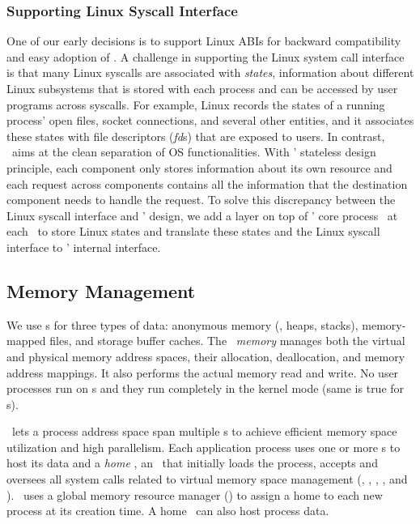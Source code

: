 \subsubsection{Supporting Linux Syscall Interface}
One of our early decisions is to support Linux ABIs for backward compatibility
and easy adoption of \lego.
A challenge in supporting the Linux system call interface is that 
many Linux syscalls are associated with {\em states},
information about different Linux subsystems that is stored with each process 
and can be accessed by user programs across syscalls.
For example, Linux records the states of a running process' open files, socket connections, and several other entities,
and it associates these states with file descriptors ({\em fd}s) that are exposed to users.
In contrast, \lego\ aims at the clean separation of OS functionalities.
With \lego' stateless design principle, each component only stores information about its own resource
and each request across components contains all the information that the destination component needs to handle the request.
To solve this discrepancy between the Linux syscall interface and \lego' design, 
we add a layer on top of \lego' core process \microos\ at each \pcomponent\ to store Linux states
and translate these states and the Linux syscall interface to \lego' internal interface.

\subsection{Memory Management}

We use \mcomponent{}s for three types of data:
anonymous memory (\ie, heaps, stacks), 
memory-mapped files, and storage buffer caches.
The \lego\ {\em memory \microos{}}
manages both the virtual and physical memory address spaces,
their allocation, deallocation, and memory address mappings.
It also performs the actual memory read and write.
No user processes run on \mcomponent{}s 
and they run completely in the kernel mode
(same is true for \scomponent{}s). 

\lego\ lets a process address space span multiple \mcomponent{}s
to achieve efficient memory space utilization and high parallelism.
Each application process uses one or more \mcomponent{}s to host its data
and a {\em home \mcomponent},
an \mcomponent\ that initially loads the process, 
accepts and oversees all system calls related to virtual memory space management
(\eg, \brk, \mmap, \munmap, and \mremap).
\lego\ uses a global memory resource manager ({\em \gmm}) to assign a home \mcomponent{} to each new process at its creation time.
A home \mcomponent\ can also host process data.

